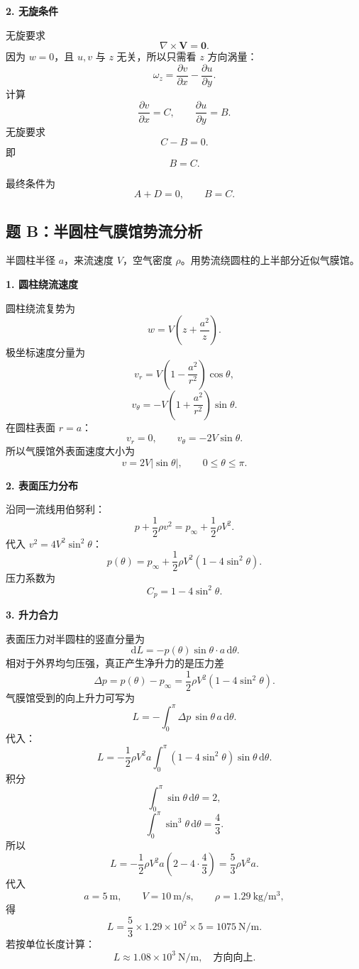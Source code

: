 ﻿\documentclass[UTF8,zihao=-4]{ctexart}
\newcommand{\dd}{\,\mathrm d}
\begin{document}
\textbf{2. 无旋条件}

无旋要求
\[
\nabla\times\bm V=\bm0.
\]
因为 \(w=0\)，且 \(u,v\) 与 \(z\) 无关，所以只需看 \(z\) 方向涡量：
\[
\omega_z=\frac{\partial v}{\partial x}-\frac{\partial u}{\partial y}.
\]
计算
\[
\frac{\partial v}{\partial x}=C,\qquad
\frac{\partial u}{\partial y}=B.
\]
无旋要求
\[
C-B=0.
\]
即
\[
\boxed{B=C.}
\]

最终条件为
\[
\boxed{A+D=0,\qquad B=C.}
\]

\subsection*{题 B：半圆柱气膜馆势流分析}

半圆柱半径 \(a\)，来流速度 \(V\)，空气密度 \(\rho\)。用势流绕圆柱的上半部分近似气膜馆。

\textbf{1. 圆柱绕流速度}

圆柱绕流复势为
\[
w=V\left(z+\frac{a^2}{z}\right).
\]
极坐标速度分量为
\[
v_r=V\left(1-\frac{a^2}{r^2}\right)\cos\theta,
\]
\[
v_\theta=-V\left(1+\frac{a^2}{r^2}\right)\sin\theta.
\]
在圆柱表面 \(r=a\)：
\[
v_r=0,\qquad
\boxed{v_\theta=-2V\sin\theta.}
\]
所以气膜馆外表面速度大小为
\[
\boxed{v=2V|\sin\theta|,\qquad 0\le\theta\le\pi.}
\]

\textbf{2. 表面压力分布}

沿同一流线用伯努利：
\[
p+\frac12\rho v^2=p_\infty+\frac12\rho V^2.
\]
代入 \(v^2=4V^2\sin^2\theta\)：
\[
\boxed{
p(\theta)=p_\infty+\frac12\rho V^2
\left(1-4\sin^2\theta\right).}
\]
压力系数为
\[
\boxed{C_p=1-4\sin^2\theta.}
\]

\textbf{3. 升力合力}

表面压力对半圆柱的竖直分量为
\[
\dd L= -p(\theta)\sin\theta\cdot a\dd\theta .
\]
相对于外界均匀压强，真正产生净升力的是压力差
\[
\Delta p=p(\theta)-p_\infty
=\frac12\rho V^2(1-4\sin^2\theta).
\]
气膜馆受到的向上升力可写为
\[
L=-\int_0^\pi \Delta p\,\sin\theta\,a\dd\theta .
\]
代入：
\[
L=-\frac12\rho V^2a
\int_0^\pi(1-4\sin^2\theta)\sin\theta\dd\theta .
\]
积分
\[
\int_0^\pi\sin\theta\dd\theta=2,
\]
\[
\int_0^\pi\sin^3\theta\dd\theta=\frac43.
\]
所以
\[
L=-\frac12\rho V^2a\left(2-4\cdot\frac43\right)
=\frac53\rho V^2a .
\]
代入
\[
a=5\ \mathrm m,\qquad V=10\ \mathrm{m/s},\qquad
\rho=1.29\ \mathrm{kg/m^3},
\]
得
\[
L=\frac53\times1.29\times10^2\times5
=1075\ \mathrm{N/m}.
\]
若按单位长度计算：
\[
\boxed{L\approx1.08\times10^3\ \mathrm{N/m},\quad \text{方向向上}.}
\]
\end{document}
